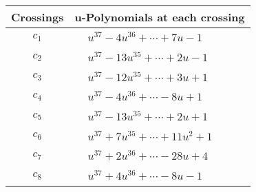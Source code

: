 \documentclass[1p]{elsarticle_modified}
\theoremstyle{definition}
\begin{document}
\begin{tabular}{m{50pt}|m{274pt}}
Crossings & \hspace{64pt}u-Polynomials at each crossing \\
\hline $$\begin{aligned}c_{1}\end{aligned}$$&$\begin{aligned}
&u^{37}-4 u^{36}+\cdots+7 u-1
\end{aligned}$\\
\hline $$\begin{aligned}c_{2}\end{aligned}$$&$\begin{aligned}
&u^{37}-13 u^{35}+\cdots+2 u-1
\end{aligned}$\\
\hline $$\begin{aligned}c_{3}\end{aligned}$$&$\begin{aligned}
&u^{37}-12 u^{35}+\cdots+3 u+1
\end{aligned}$\\
\hline $$\begin{aligned}c_{4}\end{aligned}$$&$\begin{aligned}
&u^{37}-4 u^{36}+\cdots-8 u+1
\end{aligned}$\\
\hline $$\begin{aligned}c_{5}\end{aligned}$$&$\begin{aligned}
&u^{37}-13 u^{35}+\cdots+2 u+1
\end{aligned}$\\
\hline $$\begin{aligned}c_{6}\end{aligned}$$&$\begin{aligned}
&u^{37}+7 u^{35}+\cdots+11 u^2+1
\end{aligned}$\\
\hline $$\begin{aligned}c_{7}\end{aligned}$$&$\begin{aligned}
&u^{37}+2 u^{36}+\cdots-28 u+4
\end{aligned}$\\
\hline $$\begin{aligned}c_{8}\end{aligned}$$&$\begin{aligned}
&u^{37}+4 u^{36}+\cdots-8 u-1
\end{aligned}$\\

\end{tabular}
\end{document}
